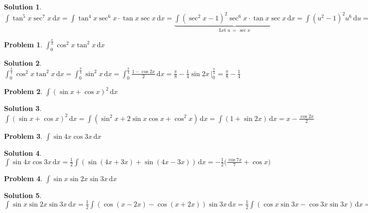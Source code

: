 \documentclass[11pt,a4paper]{article}
\newcommand{\ds}{\displaystyle}
\theoremstyle{definition}
\newtheorem*{problem}{Problem}
\newtheorem*{solution}{Solution}
\begin{document}
\begin{solution}
  $\ds\int\!\tan^5 x \sec^7 x\,\text{d}x = \int\!\tan^4 x \sec^6 x\cdot\tan x\sec x\,\text{d}x = \underbrace{\int\!(\sec^2 x - 1)^2\sec^6 x\cdot\tan x\sec x\,\text{d}x}_{\text{Let}\;u\,=\,\sec x} = \int\!(u^2 - 1)^2 u^6\,\text{d}u = \int\!(u^{10} - 2u^8 + u^6)\,\text{d}u = \frac{u^{11}}{11} - \frac{2u^9}{9} + \frac{u^7}{7} = \frac{\sec^{11}x}{11} - \frac{2\sec^9 x}{9} + \frac{\sec^7 x}{7}$
\end{solution}

\begin{problem}
  $\ds\int_0^{\frac{\pi}{4}}\!\cos^2 x \tan^2 x \,\text{d}x$
\end{problem}

\begin{solution}
  $\ds\int_0^{\frac{\pi}{4}}\!\cos^2 x \tan^2 x \,\text{d}x = \int_0^{\frac{\pi}{4}}\!\sin^2 x\,\text{d}x = \int_0^{\frac{\pi}{4}}\!\frac{1 - \cos 2x}{2}\,\text{d}x = \frac{\pi}{8} - \frac{1}{4}\sin 2x\,\Big|_0^{\frac{\pi}{4}} = \frac{\pi}{8} - \frac{1}{4}$
\end{solution}

\begin{problem}
  $\ds\int\!(\sin x + \cos x)^2\,\text{d}x$
\end{problem}

\begin{solution}
  $\ds\int\!(\sin x + \cos x)^2\,\text{d}x = \int\!(\sin^2 x + 2\sin x\cos x + \cos^2 x)\,\text{d}x = \int\!(1 + \sin 2x)\,\text{d}x = x - \frac{\cos 2x}{2}$
\end{solution}

\begin{problem}
  $\ds\int\!\sin 4x\cos 3x\,\text{d}x$
\end{problem}

\begin{solution}
  $\ds\int\!\sin 4x\cos 3x\,\text{d}x = \frac{1}{2}\int\!(\sin(4x + 3x) + \sin(4x - 3x))\,\text{d}x = -\frac{1}{2}\bigg(\frac{\cos 7x}{7} + \cos x\bigg)$
\end{solution}

\begin{problem}
  $\ds\int\!\sin x \sin 2x \sin 3x\,\text{d}x$
\end{problem}

\begin{solution}
  $\ds\int\!\sin x \sin 2x \sin 3x\,\text{d}x = \frac{1}{2}\int\!(\cos(x - 2x) - \cos(x + 2x))\sin 3x\,\text{d}x = \frac{1}{2}\int\!(\cos x\sin 3x - \cos 3x\sin 3x)\,\text{d}x = \frac{1}{4}\int\!(\sin(3x - x) + \sin(3x + x) - \sin 6x)\,\text{d}x = \frac{1}{4}\int\!(\sin 2x + \sin 4x - \sin 6x)\,\text{d}x = -\frac{\cos 2x}{8} - \frac{\cos 4x}{16} + \frac{\cos 6x}{24}$
\end{solution}
\end{document}
